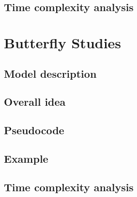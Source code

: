 \documentclass{article}
\begin{document}
\subsection*{Time complexity analysis}



\section*{Butterfly Studies}

\subsection*{Model description}

\subsection*{Overall idea}

\subsection*{Pseudocode}

\subsection*{Example}

\subsection*{Time complexity analysis}
\end{document}

